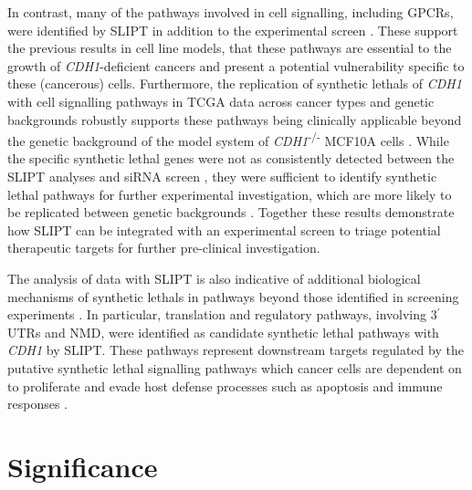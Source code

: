 In contrast, many of the pathways involved in cell signalling, including \glspl{GPCR}, were identified by \gls{SLIPT} in addition to the experimental screen \citep{Telford2015}. These support the previous results in cell line models, that these pathways are \gls{essential} to the growth of \textit{CDH1}-deficient cancers and present a potential vulnerability specific to these (cancerous) cells. Furthermore, the replication of \glspl{synthetic lethal} of \textit{CDH1} with cell signalling pathways in \gls{TCGA} data across cancer types and genetic backgrounds robustly supports these pathways being clinically applicable beyond the genetic background of the model system of \textit{CDH1}\textsuperscript{-/-} MCF10A cells \citep{Chen2014}. While the specific \gls{synthetic lethal} genes were not as consistently detected between the \gls{SLIPT} analyses and \gls{siRNA} screen \citep{Telford2015}, they were sufficient to identify \gls{synthetic lethal} pathways for further experimental investigation, which are more likely to be replicated between genetic backgrounds \citep{Dixon2008}. Together these results demonstrate how \gls{SLIPT} can be integrated with an experimental screen to triage potential therapeutic targets  for further pre-clinical investigation.

The analysis of  data with \gls{SLIPT} is also indicative of additional biological mechanisms of \glspl{synthetic lethal} in pathways beyond those identified in screening experiments \citep{Telford2015}. In particular, translation and regulatory pathways, involving 3$^\prime$ \glspl{UTR} and \gls{NMD}, were identified as candidate \gls{synthetic lethal} pathways with \textit{CDH1} by \gls{SLIPT}. These pathways represent downstream targets regulated by the putative \gls{synthetic lethal} signalling pathways which cancer cells are dependent on to proliferate and evade host defense processes such as apoptosis and immune responses \citep{Gao2015} . 



\section{Significance}
\label{chapt6:significance}

